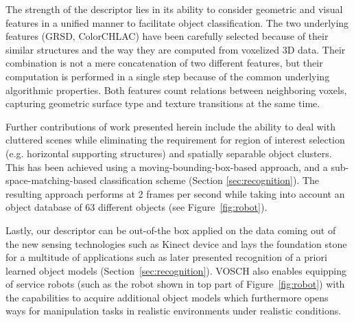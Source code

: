 \documentclass[conference]{sty/IEEEtran}
\begin{document}
The strength of the descriptor lies in its ability to consider geometric and
visual features in a unified manner to facilitate object classification. The two
underlying features (GRSD, ColorCHLAC) have been carefully selected because of their similar structures
and the way they are computed from voxelized 3D data. Their combination is
not a mere concatenation of two different features, but their computation is
performed in a single step because of the common underlying algorithmic
properties. Both features %
count relations between neighboring voxels, capturing geometric surface type and texture
transitions at the same time.

Further contributions of work presented herein include the ability to deal with
cluttered scenes while eliminating the requirement for region of interest
selection (e.g. horizontal supporting structures) and spatially separable object
clusters. This has been achieved using a moving-bounding-box-based approach, and
a sub-space-matching-based classification scheme (Section
\ref{sec:recognition}). The resulting approach performs at 2 frames per second
while taking into account an object database of 63 different objects
(see Figure~\ref{fig:robot}).



Lastly, our descriptor can be out-of-the box applied on the data coming out of the 
new sensing technologies such as Kinect device and lays the foundation stone for a
multitude of applications such as later presented recognition of a priori learned object models
(Section~\ref{sec:recognition}). VOSCH also enables equipping of service robots 
(such as the robot shown in top part of Figure~\ref{fig:robot}) with the 
capabilities to acquire additional object models which furthermore opens ways 
for manipulation tasks in realistic environments under realistic conditions.
\end{document}
